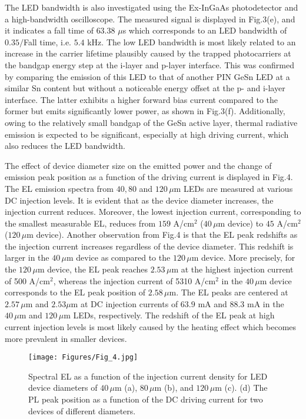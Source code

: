 The LED bandwidth is also investigated using the Ex-InGaAs photodetector and a high-bandwidth oscilloscope. The measured signal is displayed in Fig.3(e), and it indicates a fall time of $63.38$ $\mu$s which corresponds to an LED bandwidth of $0.35/$Fall time, i.e. $5.4$ kHz. The low LED bandwidth is most likely related to an increase in the carrier lifetime plausibly caused by the trapped photocarriers at the bandgap energy step at the i-layer and p-layer interface. This was confirmed by comparing the emission of this LED to that of another PIN GeSn LED at a similar Sn content but without a noticeable energy offset at the p- and i-layer interface. The latter exhibits a higher forward bias current compared to the former but emits significantly lower power, as shown in Fig.3(f). Additionally, owing to the relatively small bandgap of the GeSn active layer, thermal radiative emission is expected to be significant,\cite{buca2022room} especially at high driving current, which also reduces the LED bandwidth.


\bigskip
The effect of device diameter size on the emitted power and the change of emission peak position as a function of the driving current is displayed in Fig.4. The EL emission spectra from $40, 80$ and $120\,\mu$m LEDs are measured at various DC injection levels. It is evident that as the device diameter increases, the injection current reduces. Moreover, the lowest injection current, corresponding to the smallest measurable EL, reduces from $159$ A/cm$^2$ ($40\,\mu$m device) to $45$ A/cm$^2$ ($120\,\mu$m device). Another observation from Fig.4 is that the EL peak redshifts as the injection current increases regardless of the device diameter.  This redshift is larger in the $40\,\mu$m device as compared to the $120\,\mu$m device. More precisely, for the $120\,\mu$m device, the EL peak reaches $2.53\,\mu$m at the highest injection current of 500 A/cm$^2$, whereas  the injection current of 5310 A/cm$^2$ in the $40\,\mu$m device corresponds to the EL peak position of $2.58\,\mu$m. The EL peaks are centered at $2.57\,\mu$m and $2.53 \mu$m at DC injection currents of $63.9$ mA and $88.3$ mA in the $40\,\mu$m and $120\,\mu$m LEDs, respectively. The redshift of the EL peak at high current injection levels is most likely caused by the heating effect which becomes more prevalent in smaller devices. 

\bigskip


\begin{figure*}[htbp]
\centering
\texttt{[image: Figures/Fig\_4.jpg]}
\caption{Spectral EL as a function of the injection current density
for LED device diameters of $40\,\mu$m (a), $80\,\mu$m (b), and $120\,\mu$m (c). (d) The PL peak position as a function of the DC driving current for two devices of different diameters.}
\label{fig:Fig__4}
\end{figure*}



